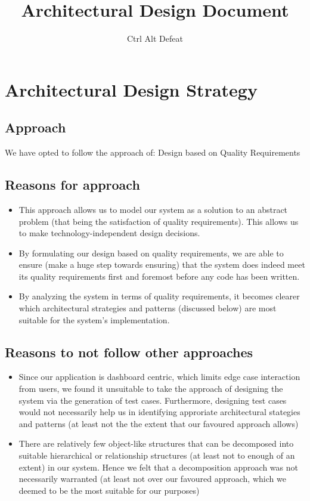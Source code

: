 \documentclass[12pt]{article}
\title{Architectural Design Document}
\author{Ctrl Alt Defeat}
\begin{document}
\maketitle

\section{Architectural Design Strategy}
\subsection{Approach}
We have opted to follow the approach of: Design based on Quality Requirements
\subsection{Reasons for approach}
\begin{itemize}
    \item This approach allows us to model our system as a solution to an abstract problem (that being the satisfaction of quality requirements). This allows us to  make technology-independent design decisions.
    \item By formulating our design based on quality requirements, we are able to ensure (make a huge step towards ensuring) that the system does indeed meet its quality requirements first and foremost before any code has been written.
    \item By analyzing the system in terms of quality requirements, it becomes clearer which architectural strategies and patterns (discussed below) are most suitable for the system's implementation.
\end{itemize}
\subsection{Reasons to not follow other approaches}
\begin{itemize}
    \item Since our application is dashboard centric, which limits edge case interaction from users, we found it unsuitable to take the approach of designing the system via the generation of test cases. Furthermore, designing test cases would not necessarily help us in identifying approriate architectural stategies and patterns (at least not the the extent that our favoured approach allows)
    \item There are relatively few object-like structures that can be decomposed into suitable hierarchical or relationship structures (at least not to enough of an extent) in our system. Hence we felt that a decomposition approach was not necessarily warranted (at least not over our favoured approach, which we deemed to be the most suitable for our purposes)
\end{itemize}
\end{document}
